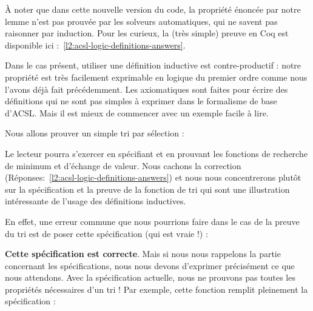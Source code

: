 


À noter que dans cette nouvelle version du code, la propriété énoncée par notre
lemme n'est pas prouvée par les solveurs automatiques, qui ne savent pas raisonner
par induction. Pour les curieux, la (très simple) preuve en Coq est disponible
ici :~\ref{l2:acsl-logic-definitions-answers}.



Dans le cas présent, utiliser une définition inductive est contre-productif :
notre propriété est très facilement exprimable en logique du premier ordre comme
nous l'avons déjà fait précédemment. Les axiomatiques sont faites pour écrire
des définitions qui ne sont pas simples à exprimer dans le formalisme de base
d'ACSL. Mais il est mieux de commencer avec un exemple facile à lire.




\label{l3:acsl-logic-definitions-inductive-sort}




Nous allons prouver un simple tri par sélection :





Le lecteur pourra s'exercer en spécifiant et en prouvant les fonctions de
recherche de minimum et d'échange de valeur. Nous cachons la correction
(Réponses:~\ref{l2:acsl-logic-definitions-answers}) et nous nous concentrerons
plutôt sur la spécification et la preuve de la fonction de tri qui sont une
illustration intéressante de l'usage des définitions inductives.


En effet, une erreur commune que nous pourrions faire dans le cas de la preuve
du tri est de poser cette spécification (qui est vraie !) :






\textbf{Cette spécification est correcte}. Mais si nous nous rappelons la
partie concernant les spécifications, nous nous devons d'exprimer précisément ce
que nous attendons. Avec la spécification actuelle, nous ne prouvons pas toutes
les propriétés nécessaires d'un tri ! Par exemple, cette fonction remplit
pleinement la spécification :






